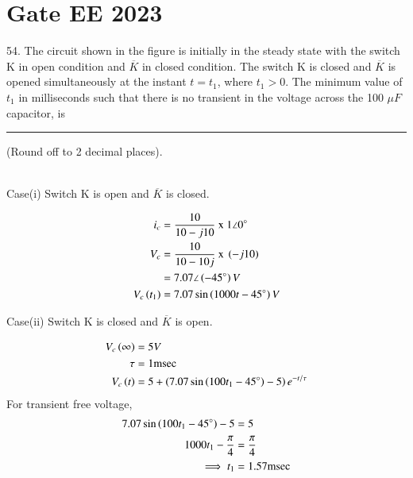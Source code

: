 \documentclass[journal,12pt,twocolumn]{IEEEtran}
\begin{document}


\vspace{3cm}

\title{}
\author{EE23BTECH11054 -  Sai Krishna Shanigarapu$^{*}$
}
\maketitle
\newpage
\bigskip


\section*{Gate EE 2023}
54. \hspace{2pt}The circuit shown in the figure is initially in the steady state with the switch K in open condition and $\overline{K}$ in closed condition. The switch K is closed and $\overline{K}$ is opened simultaneously at the instant $t = t_1$, where $t_1 > 0$. The minimum value of $t_1$ in milliseconds such that there is no transient in the voltage across the 100 $\mu F$ capacitor, is \rule{1cm}{0.15mm} (Round off to 2 decimal places).
%
\begin{figure}[h!]
  \centering
  \resizebox{0.8\columnwidth}{!}{}
\end{figure}

\solution\\

Case(i) Switch K is open and $\overline{K}$ is closed.
\begin{figure}[h!]
  \centering
  \resizebox{0.50\columnwidth}{!}{}
\end{figure}

\begin{align}
    i_c &= \frac{10}{10-j 10}\text{ x } 1\angle 0^\circ\\
    V_c &= \frac{10}{10-10 j}\text{ x }\left(-j10\right)\\
    &= 7.07 \angle \left(-45^\circ\right)V\\
    V_c\left(t_1\right) &= 7.07\sin \left(1000t-45^\circ\right)V
\end{align}

\newpage
Case(ii) Switch K is closed and $\overline{K}$ is open.

\begin{figure}[h!]
  \centering
  \resizebox{0.55\columnwidth}{!}{}
\end{figure}

\begin{align}
    V_c\left(\infty\right) &= 5V\\
    \tau &= 1\text{msec}\\
    V_c\left(t\right) &= 5 + \left(7.07\sin \left(100t_1 - 45^\circ\right)-5\right)e^{-t/ \tau}
\end{align}
For transient free voltage,
\begin{align}
    7.07\sin \left(100t_1 - 45^\circ\right)-5 &= 5\\
    1000t_1 - \frac{\pi}{4} &= \frac{\pi}{4}\\
    \implies t_1 &= 1.57 \text{msec}
\end{align}


\end{document}
